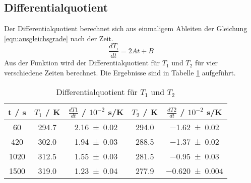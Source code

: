 \subsection{Differentialquotient}
Der Differentialquotient berechnet sich aus einmaligem Ableiten der Gleichung \ref{eqn:ausgleichsgrade} nach der Zeit.
\begin{equation}
  \frac{dT_\text{i}}{dt} = 2At + B
  \label{eqn:diffq}
\end{equation}
Aus der Funktion wird der Differentialquotient für $T_\text{1}$ und $T_\text{2}$ für vier verschiedene Zeiten berechnet. Die Ergebnisse sind in Tabelle \ref{tab:diffQ} aufgeführt.
\begin{table}
  \centering
  \begin{tabular}{c c c c c}
  	\toprule
	t / s & $T_\text{1}$ / K & $\frac{dT1}{dt}$ / $10^{-2}$ s/K & $T_\text{2}$ / K & $\frac{dT2}{dt}$ / $10^{-2}$ s/K \\
	\midrule
	60	& 294.7   & \num{2.16 +- 0.02} & 294.0 & \num{-1.62 +- 0.02} \\
	420	& 302.0   & \num{1.94 +- 0.03} & 288.5 & \num{-1.37 +- 0.02} \\
	1020	& 312.5   & \num{1.55 +- 0.03} & 281.5 & \num{-0.95 +- 0.03} \\
	1500	& 319.0   & \num{1.23 +- 0.04} & 277.9 & \num{-0.620 +- 0.004} \\
	\bottomrule
  \end{tabular}
  \caption{Differentialquotient für $T_\text{1}$ und $T_\text{2}$}
  \label{tab:diffQ}
\end{table}

